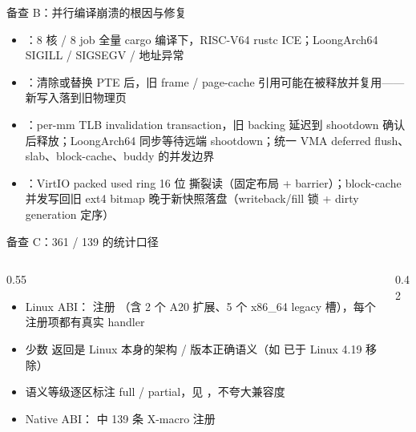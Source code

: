\documentclass[aspectratio=1610]{beamer}
\begin{document}
\begin{frame}{备查 B：并行编译崩溃的根因与修复}
    \footnotesize
    \begin{itemize}
        \item {}：8 核 / 8 job 全量 cargo 编译下，RISC-V64 rustc ICE；LoongArch64 SIGILL / SIGSEGV / 地址异常
        \item {}：清除或替换 PTE 后，旧 frame / page-cache 引用可能在被释放并复用——新写入落到旧物理页
        \item {}：per-mm TLB invalidation transaction，旧 backing 延迟到 shootdown 确认后释放；LoongArch64 同步等待远端 shootdown；统一 VMA deferred flush、slab、block-cache、buddy 的并发边界
        \item {}：VirtIO packed used ring 16 位  撕裂读（固定布局 + barrier）；block-cache 并发写回旧 ext4 bitmap 晚于新快照落盘（writeback/fill 锁 + dirty generation 定序）
    \end{itemize}
    \vspace{0.3em}
\end{frame}

\begin{frame}{备查 C：361 / 139 的统计口径}
    \begin{columns}[t]
        \begin{column}{0.55\textwidth}
            \footnotesize
            \begin{itemize}
                \item Linux ABI： 注册 （含 2 个 A20 扩展、5 个 x86\_64 legacy 槽），每个注册项都有真实 handler
                \item 少数  返回是 Linux 本身的架构 / 版本正确语义（如  已于 Linux 4.19 移除）
                \item 语义等级逐区标注 full / partial，见 ，不夸大兼容度
                \item Native ABI： 中 139 条 X-macro 注册
            \end{itemize}
        \end{column}
        \begin{column}{0.42\textwidth}
        \end{column}
    \end{columns}
\end{frame}
\end{document}
